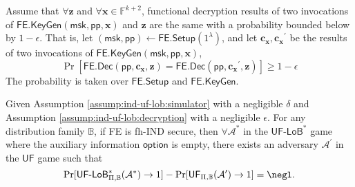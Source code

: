 \begin{assumption}
\label{assump:ind-uf-lob:decryption}
	Assume that $\forall \mathbf{z}$ and $\forall \mathbf{x} \in \mathbb{F}^{k+2}$, functional decryption results of two invocations of $\textsf{FE.KeyGen}( \textsf{msk}, \textsf{pp}, \mathbf{x})$ and $\mathbf{z}$ are the same with a probability bounded below by $1 - \epsilon$.
	That is, let $(\textsf{msk}, \textsf{pp}) \gets \textsf{FE.Setup}(1^\lambda)$, and let $\mathbf{c_x}, \mathbf{c_x}^\prime$ be the results of two invocations of $\textsf{FE.KeyGen}( \textsf{msk}, \textsf{pp}, \mathbf{x})$,
\[
	\Pr \left[
		\textsf{FE.Dec}(\textsf{pp}, \mathbf{c_x}, \mathbf{z}) = \textsf{FE.Dec}(\textsf{pp}, \mathbf{c_x}^\prime, \mathbf{z})
	\right] \geq 1 - \epsilon
\]
	The probability is taken over $\textsf{FE.Setup}$ and $\textsf{FE.KeyGen}$.

\end{assumption}


\begin{theorem}
\label{thm:ind-uf-lob2}

	Given Assumption \ref{assump:ind-uf-lob:simulator} with a negligible $\delta$ and Assumption \ref{assump:ind-uf-lob:decryption} with a negligible $\epsilon$.
For any distribution family $\mathbb{B}$, if \textsf{FE} is fh-IND secure, then $\forall \mathcal{A}^*$ in the $\textsf{UF-LoB}^*$ game where the auxiliary information $\textsf{option}$ is empty, there exists an adversary $\mathcal{A}^\prime$ in the $\textsf{UF}$ game such that 
\[
	\Pr[\textsf{UF-LoB}^*_{\Pi, \mathbb{B}}(\mathcal{A}^*) \to 1] - \Pr[\textsf{UF}_{\Pi, \mathbb{B}}(\mathcal{A}^\prime) \to 1] = \negl.
\]

\end{theorem}


